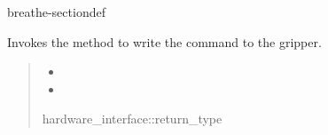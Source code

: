 \documentclass[letterpaper,10pt,english]{sphinxmanual}
\begin{document}
\begin{fulllineitems}
\begin{sphinxuseclass}{breathe-sectiondef}
\begin{fulllineitems}
\sphinxAtStartPar
Invokes the {\hyperref[\detokenize{code/bioscara_hardware_drivers/index:classbioscara__hardware__drivers_1_1Gripper_1abdf1f8e545da0a246f4effd78ae09f35}]{}} method to write the command to the gripper.
\begin{quote}\begin{description}
\begin{itemize}
\item {} 
\sphinxAtStartPar
{} \textendash{} 

\item {} 
\sphinxAtStartPar
{} \textendash{} 

\end{itemize}

\sphinxAtStartPar
hardware\_interface::return\_type 

\end{description}\end{quote}

\end{fulllineitems}



\end{sphinxuseclass}
\end{fulllineitems}
\end{document}
